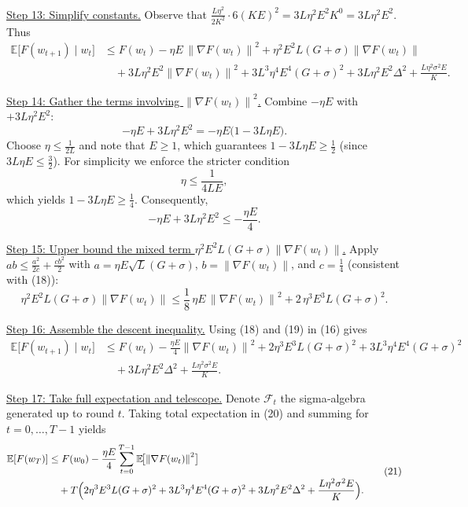 \documentclass{article}
\newcommand{\E}{\mathbb{E}}
\newcommand{\norm}[1]{\left\|#1\right\|}
\begin{document}
\noindent\underline{Step 13: Simplify constants.}  
Observe that $\frac{L\eta^2}{2K^2}\cdot6(KE)^2=3L\eta^2E^2K^0=3L\eta^2E^2$.
Thus
\[
\begin{aligned}
\E\!\bigl[F(w_{t+1})\mid w_t\bigr]
&\le F(w_t)
-\eta E\,\norm{\nabla F(w_t)}^2
+ \eta^2 E^2 L (G+\sigma)\norm{\nabla F(w_t)}\\
&\quad+3L\eta^2E^2\norm{\nabla F(w_t)}^2
+3L^3\eta^4E^4(G+\sigma)^2
+3L\eta^2E^2\Delta^2
+\frac{L\eta^2\sigma^2E}{K}.
\end{aligned}
\tag{16}
\]

\noindent\underline{Step 14: Gather the terms involving $\norm{\nabla F(w_t)}^2$.}  
Combine $-\eta E$ with $+3L\eta^2E^2$:
\[
-\eta E+3L\eta^2E^2
= -\eta E\bigl(1-3L\eta E\bigr).
\]
Choose $\eta\le\frac{1}{2L}$ and note that $E\ge1$, which guarantees $1-3L\eta E\ge\frac12$ (since $3L\eta E\le\frac32$). For simplicity we enforce the stricter condition
\[
\eta\le\frac{1}{4LE},
\tag{17}
\]
which yields $1-3L\eta E\ge\frac14$. Consequently,
\[
-\eta E+3L\eta^2E^2\le -\frac{\eta E}{4}.
\tag{18}
\]

\noindent\underline{Step 15: Upper bound the mixed term $\eta^2E^2L(G+\sigma)\norm{\nabla F(w_t)}$.}  
Apply $ab\le \frac{a^2}{2c}+ \frac{c b^2}{2}$ with $a=\eta E\sqrt{L}(G+\sigma)$, $b=\norm{\nabla F(w_t)}$, and $c=\frac14$ (consistent with (18)):
\[
\eta^2E^2 L(G+\sigma)\norm{\nabla F(w_t)}
\le \frac{1}{8}\,\eta E\,\norm{\nabla F(w_t)}^2
   +2\,\eta^3E^3L(G+\sigma)^2 .
\tag{19}
\]

\noindent\underline{Step 16: Assemble the descent inequality.}  
Using (18) and (19) in (16) gives
\[
\begin{aligned}
\E\!\bigl[F(w_{t+1})\mid w_t\bigr]
&\le F(w_t)
-\frac{\eta E}{4}\norm{\nabla F(w_t)}^2
+2\eta^3E^3L(G+\sigma)^2
+3L^3\eta^4E^4(G+\sigma)^2\\
&\quad+3L\eta^2E^2\Delta^2
+\frac{L\eta^2\sigma^2E}{K}.
\end{aligned}
\tag{20}
\]

\noindent\underline{Step 17: Take full expectation and telescope.}  
Denote $\mathcal{F}_t$ the sigma‑algebra generated up to round $t$. Taking total expectation in (20) and summing for $t=0,\dots,T-1$ yields
\[
\begin{aligned}
\E[F(w_T)] &\le F(w_0)
-\frac{\eta E}{4}\sum_{t=0}^{T-1}\E\!\bigl[\norm{\nabla F(w_t)}^2\bigr]\\
&\quad+T\Bigl(2\eta^3E^3L(G+\sigma)^2
+3L^3\eta^4E^4(G+\sigma)^2
+3L\eta^2E^2\Delta^2
+\frac{L\eta^2\sigma^2E}{K}\Bigr).
\end{aligned}
\tag{21}
\]
\end{document}
